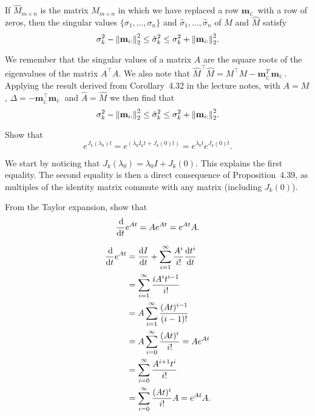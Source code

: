 If \(\hat{M}_{m \times n}\) is the matrix \(M_{m \times n}\) in which we have replaced a row \(\mathbf{m}_{i:}\) with a row of zeros, then the singular values \(\{\sigma_1, \dots, \sigma_n\}\) and \(\hat{\sigma}_1, \dots, \hat{\sigma}_n\) of \(M\) and \(\hat{M}\) satisfy
\[
\sigma_k^2 - {\left\lVert\mathbf{m}_{i:}\right\rVert}_2^2 \leq \hat{\sigma}_k^2 \leq \sigma_k^2 + {\left\lVert\mathbf{m}_{i:}\right\rVert}_2^2.
\]

\begin{solution}
	We remember that the singular values of a matrix \(A\) are the square roots of the eigenvalues of the matrix \(A^\top A\).
	We also note that \(\hat{M}^\top \hat{M} = M^\top M - \mathbf{m}_{i:}^T\mathbf{m}_{i:}\).
	Applying the result derived from Corollary~4.32 in the lecture notes, with \(A = M\), \(\Delta = -\mathbf{m}_{i:}^\top \mathbf{m}_{i:}\) and \(\hat{A} = \hat{M}\) we then find that
	\[
	\sigma_k^2 - {\left\lVert\mathbf{m}_{i:}\right\rVert}_2^2 \leq \hat{\sigma}_k^2 \leq \sigma_k^2 + {\left\lVert\mathbf{m}_{i:}\right\rVert}_2^2.
	\]
\end{solution}

Show that
\[
e^{J_k(\lambda_0)t} = e^{(\lambda_0I_kt + J_k(0)t)} = e^{\lambda_0t} e^{J_k(0)t}.
\]

\begin{solution}
	We start by noticing that \(J_k(\lambda_0) = \lambda_0 I + J_k(0)\).
	This explains the first equality.
	The second equality is then a direct consequence of Proposition~4.39, as multiples of the identity matrix commute with any matrix (including \(J_k(0)\)).
\end{solution}

From the Taylor expansion, show that
\[
\dfrac{\operatorname{d}\! }{\operatorname{d}\! t} e^{At} = A e^{At} = e^{At} A.
\]

\begin{solution}
	\begin{align*}
	\dfrac{\operatorname{d}\! }{\operatorname{d}\! t}e^{At}
	& = \dfrac{\operatorname{d}\! I}{\operatorname{d}\! t} + \sum_{i=1}^\infty \frac{A^i}{i!} \dfrac{\operatorname{d}\! t^i}{\operatorname{d}\! t}\\
	& = \sum_{i=1}^\infty \frac{iA^it^{i-1}}{i!}\\
	& = A\sum_{i=1}^\infty \frac{(At)^{i-1}}{(i-1)!}\\
	& = A \sum_{i=0}^\infty \frac{(At)^i}{i!} = A e^{At}\\
	& = \sum_{i=0}^\infty \frac{A^{i+1} t^i}{i!}\\
	& = \sum_{i=0}^\infty \frac{(At)^i}{i!} A = e^{At} A.
	\end{align*}
\end{solution}

